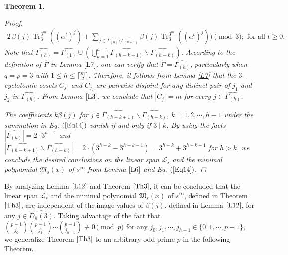 \documentclass[pdflatex,sn-mathphys-num]{sn-jnl}%
\theoremstyle{thmstyleone}%
\newtheorem{theorem}{Theorem}%
\theoremstyle{thmstyletwo}%
\theoremstyle{thmstylethree}%
\begin{document}
\begin{theorem}
\begin{proof}
\begin{align}
        2\,\beta(j)\operatorname{Tr}_{3}^{3^m}\left((\alpha^{t})^{j}\right) 
    + \sum_{j\in\widehat{\Gamma_{(h)}}\setminus\widehat{\Gamma_{(h-1)}}}
        \beta(j)\operatorname{Tr}_{3}^{3^m}\left((\alpha^{t})^{j}\right) 
\Biggr)
\pmod{3}; \text{ for all }t\geq 0.
        \end{align}
        Note that $\widehat{\Gamma_{(h)}}=\widehat{\Gamma_{(1)}}\cup\left(\bigcup_{k=1}^{h-1}\widehat{\Gamma_{(h-k+1)}}\backslash\widehat{\Gamma_{(h-k)}}\right)$. According to the definition of $\hat{\Gamma}$ in Lemma $\ref{L7}$, one can verify that $\hat{\Gamma}=\widehat{\Gamma_{(h)}}$, particularly when $q=p=3$ with $1\leq h\leq\lceil\frac{m}{2}\rceil$. Therefore, it follows from Lemma \ref{L7} that the $3$-cyclotomic cosets $C_{j_1}$ and $C_{j_2}$ are pairwise disjoint for any distinct pair of $j_1$ and $j_2$ in $\widehat{\Gamma_{(h)}}$. From Lemma $\ref{L3}$, we conclude that $|C_{j}|=m$ for every $j\in\widehat{\Gamma_{(h)}}$.
        \par The coefficients $k\beta(j)$ for $j\in\widehat{\Gamma_{(h-k+1)}}\backslash\widehat{\Gamma_{(h-k)}}$, $k=1,2,\cdots,h-1$ under the summation in Eq. $(\ref{Eq14})$ vanish if and only if $3\mid k$. By using the facts $|\widehat{\Gamma_{(h)}}|=2\cdot3^{h-1}$ and $|\widehat{\Gamma_{(h-k+1)}}\backslash\widehat{\Gamma_{(h-k)}}|=2\cdot(3^{h-k}-3^{h-k-1})=3^{h-k}+3^{h-k-1}$ for $h>k$, we conclude the desired conclusions on the linear span $\mathcal{L}_{s}$ and the minimal polynomial $\mathfrak{M}_{s}(x)$ of $s^{\infty}$ from Lemma $\ref{L6}$ and Eq. $(\ref{Eq14})$.
    \end{proof}
\end{theorem}
By analyzing Lemma $\ref{L12}$ and Theorem $\ref{Th3}$, it can be concluded that the linear span $\mathcal{L}_{s}$ and the minimal polynomial $\mathfrak{M}_{s}(x)$ of $s^{\infty}$, defined in Theorem $\ref{Th3}$, are independent of the image values of $\beta(j)$, defined in Lemma $\ref{L12}$, for any $j\in\widehat{D_{h}(3)}$. Taking advantage of the fact that $\binom{p-1}{j_{0}}\binom{p-1}{j_{1}}\cdots\binom{p-1}{j_{h-1}}\not\equiv 0\pmod{p}$ for any $j_{0},j_{1},\cdots,j_{h-1}\in\{0,1,\cdots,p-1\}$, we generalize Theorem $\ref{Th3}$ to an arbitrary odd prime $p$ in the following Theorem. %
\end{document}
